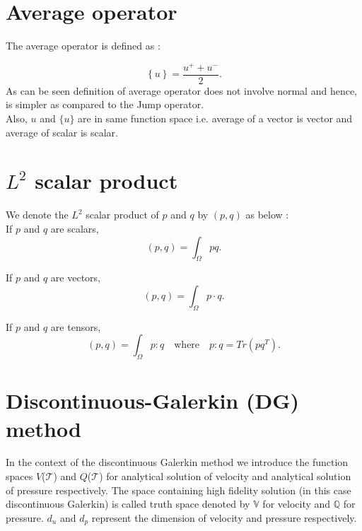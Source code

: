 \documentclass[a4paper,oneside,openright,spanish,english]{book}
\begin{document}
\section{Average operator}

The average operator is defined as :

\begin{equation}\label{average operator}
\left\lbrace u \right\rbrace = \frac{u^+ + u^-}{2} \textrm{.}
\end{equation} 
\noindent
As can be seen definition of average operator does not involve normal and hence, is simpler as compared to the Jump operator.\\
Also, $u$ and $\lbrace u \rbrace$ are in same function space i.e. average of a vector is vector and average of scalar is scalar.\\

\section{$L^2$ scalar product}

We denote the $L^2$ scalar product of $p$ and $q$ by $(p,q)$ as below :\\

If $p$ and $q$ are scalars,
\begin{equation}\label{inner product scalars}
(p,q)=\int_{\Omega} pq \textrm{.}
\end{equation}

If $p$ and $q$ are vectors,
\begin{equation}\label{Inner product vectors}
(p,q)=\int_{\Omega} p \cdot q \textrm{.}
\end{equation}

If $p$ and $q$ are tensors,
\begin{equation}\label{Inner product tensors}
(p,q)=\int_{\Omega} p : q \quad \textrm{where} \quad p:q = Tr(pq^T) \textrm{.}
\end{equation}

\section{Discontinuous-Galerkin (DG) method}

In the context of the discontinuous Galerkin method we introduce the function spaces $V$($\mathcal{T}$) and $Q$($\mathcal{T}$) for analytical solution of velocity and analytical solution of pressure respectively. The space containing high fidelity solution (in this case discontinuous Galerkin) is called truth space denoted by $\mathbb{V}$ for velocity and $\mathbb{Q}$ for pressure. $d_u$ and $d_p$ represent the dimension of velocity and pressure respectively.
\end{document}

